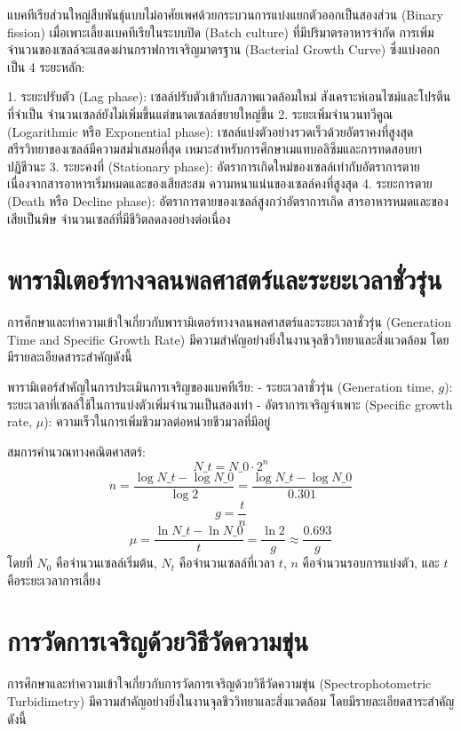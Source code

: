 แบคทีเรียส่วนใหญ่สืบพันธุ์แบบไม่อาศัยเพศด้วยกระบวนการแบ่งแยกตัวออกเป็นสองส่วน (Binary fission) เมื่อเพาะเลี้ยงแบคทีเรียในระบบปิด (Batch culture) ที่มีปริมาตรอาหารจำกัด การเพิ่มจำนวนของเซลล์จะแสดงผ่านกราฟการเจริญมาตรฐาน (Bacterial Growth Curve) ซึ่งแบ่งออกเป็น 4 ระยะหลัก:

1. ระยะปรับตัว (Lag phase): เซลล์ปรับตัวเข้ากับสภาพแวดล้อมใหม่ สังเคราะห์เอนไซม์และโปรตีนที่จำเป็น จำนวนเซลล์ยังไม่เพิ่มขึ้นแต่ขนาดเซลล์ขยายใหญ่ขึ้น
2. ระยะเพิ่มจำนวนทวีคูณ (Logarithmic หรือ Exponential phase): เซลล์แบ่งตัวอย่างรวดเร็วด้วยอัตราคงที่สูงสุด สรีรวิทยาของเซลล์มีความสม่ำเสมอที่สุด เหมาะสำหรับการศึกษาเมแทบอลิซึมและการทดสอบยาปฏิชีวนะ
3. ระยะคงที่ (Stationary phase): อัตราการเกิดใหม่ของเซลล์เท่ากับอัตราการตาย เนื่องจากสารอาหารเริ่มหมดและของเสียสะสม ความหนาแน่นของเซลล์คงที่สูงสุด
4. ระยะการตาย (Death หรือ Decline phase): อัตราการตายของเซลล์สูงกว่าอัตราการเกิด สารอาหารหมดและของเสียเป็นพิษ จำนวนเซลล์ที่มีชีวิตลดลงอย่างต่อเนื่อง

\section{พารามิเตอร์ทางจลนพลศาสตร์และระยะเวลาชั่วรุ่น}

การศึกษาและทำความเข้าใจเกี่ยวกับพารามิเตอร์ทางจลนพลศาสตร์และระยะเวลาชั่วรุ่น (Generation Time and Specific Growth Rate) มีความสำคัญอย่างยิ่งในงานจุลชีววิทยาและสิ่งแวดล้อม โดยมีรายละเอียดสาระสำคัญดังนี้

พารามิเตอร์สำคัญในการประเมินการเจริญของแบคทีเรีย:
- ระยะเวลาชั่วรุ่น (Generation time, $g$): ระยะเวลาที่เซลล์ใช้ในการแบ่งตัวเพิ่มจำนวนเป็นสองเท่า
- อัตราการเจริญจำเพาะ (Specific growth rate, $\mu$): ความเร็วในการเพิ่มชีวมวลต่อหน่วยชีวมวลที่มีอยู่

สมการคำนวณทางคณิตศาสตร์:
\[ N\_t = N\_0 \cdot 2^n \]
\[ n = \frac{\log N\_t - \log N\_0}{\log 2} = \frac{\log N\_t - \log N\_0}{0.301} \]
\[ g = \frac{t}{n} \]
\[ \mu = \frac{\ln N\_t - \ln N\_0}{t} = \frac{\ln 2}{g} \approx \frac{0.693}{g} \]
โดยที่ $N_0$ คือจำนวนเซลล์เริ่มต้น, $N_t$ คือจำนวนเซลล์ที่เวลา $t$, $n$ คือจำนวนรอบการแบ่งตัว, และ $t$ คือระยะเวลาการเลี้ยง

\section{การวัดการเจริญด้วยวิธีวัดความขุ่น}

การศึกษาและทำความเข้าใจเกี่ยวกับการวัดการเจริญด้วยวิธีวัดความขุ่น (Spectrophotometric Turbidimetry) มีความสำคัญอย่างยิ่งในงานจุลชีววิทยาและสิ่งแวดล้อม โดยมีรายละเอียดสาระสำคัญดังนี้

